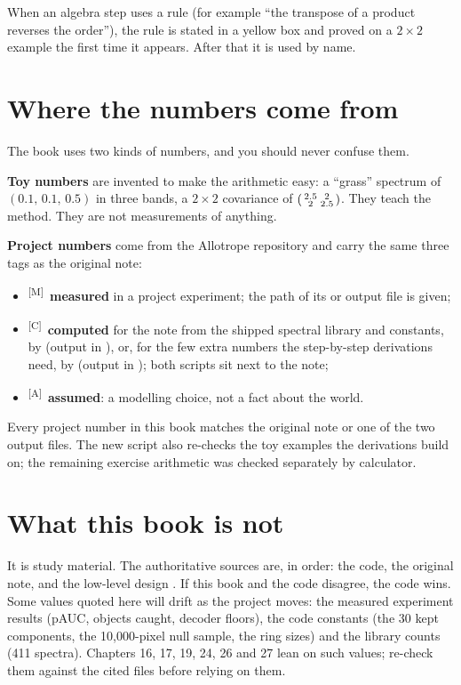 \documentclass[11pt,a4paper,oneside,openany]{book}
\newcommand{\meas}{\textsuperscript{\textsf{\scriptsize[M]}}}
\newcommand{\comp}{\textsuperscript{\textsf{\scriptsize[C]}}}
\newcommand{\assm}{\textsuperscript{\textsf{\scriptsize[A]}}}
\begin{document}
When an algebra step uses a rule (for example ``the transpose of a product reverses the order''), the rule is stated in
a yellow box and proved on a $2\times2$ example the first time it appears. After that it is used by name.

\section*{Where the numbers come from}

The book uses two kinds of numbers, and you should never confuse them.

\textbf{Toy numbers} are invented to make the arithmetic easy: a ``grass'' spectrum of $(0.1,\,0.1,\,0.5)$ in three
bands, a $2\times2$ covariance of $\begin{psmallmatrix}2.5&2\\2&2.5\end{psmallmatrix}$. They teach the method. They are
not measurements of anything.

\textbf{Project numbers} come from the Allotrope repository and carry the same three tags as the original note:
\begin{itemize}
\item \meas\ \textbf{measured} in a project experiment; the path of its  or output file is given;
\item \comp\ \textbf{computed} for the note from the shipped spectral library and constants, by
   (output in ), or, for the few extra numbers the step-by-step
  derivations need, by  (output in ); both scripts sit
  next to the note;
\item \assm\ \textbf{assumed}: a modelling choice, not a fact about the world.
\end{itemize}
Every project number in this book matches the original note or one of the two output files. The new script also
re-checks the toy examples the derivations build on; the remaining exercise arithmetic was checked separately by calculator.

\section*{What this book is not}

It is study material. The authoritative sources are, in order: the code, the original note, and the low-level design
. If this book and the code disagree, the code wins. Some values quoted here
will drift as the project moves: the measured experiment results (pAUC, objects caught, decoder floors), the code
constants (the 30 kept components, the 10{,}000-pixel null sample, the ring sizes) and the library counts (411 spectra).
Chapters 16, 17, 19, 24, 26 and 27 lean on such values; re-check them against the cited files before relying on them.
\end{document}
